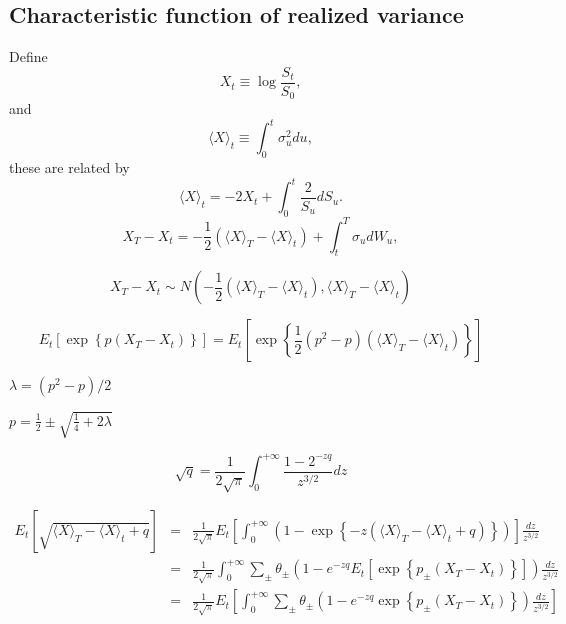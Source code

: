 \documentclass[12pt]{article}
\begin{document}
    \subsection{Characteristic function of realized variance}
    Define
    \begin{equation}
      X_t\equiv\log\frac{S_t}{S_0},
    \end{equation}
    and
    \begin{equation}
      \langle X \rangle_t\equiv\int_0^t\sigma_u^2du,
    \end{equation}
    these are related by
    \begin{equation}
      \langle X \rangle_t=-2X_t+\int_0^t\frac{2}{S_u}dS_u.
    \end{equation}
  \begin{equation}
    X_T-X_t=-\frac{1}{2}\left(\langle X \rangle_T - \langle X \rangle_t\right) + \int_t^T\sigma_udW_u,
  \end{equation}

  \begin{equation}
    X_T-X_t\sim N\left(-\frac{1}{2}\left(\langle X \rangle_T - \langle X \rangle_t\right), \langle X \rangle_T - \langle X \rangle_t\right)
  \end{equation}

  \begin{equation}
    E_t\left[\exp\left\{p\left(X_T-X_t\right)\right\}\right] = E_t\left[\exp\left\{\frac{1}{2}\left(p^2-p\right)\left(\langle X \rangle_T - \langle X \rangle_t\right)\right\}\right]
  \end{equation}

  $\lambda=(p^2-p)/2$

  $p=\frac{1}{2}\pm\sqrt{\frac{1}{4}+2\lambda}$


  \begin{equation}
    \sqrt{q} = \frac{1}{2\sqrt{\pi}}\int_0^{+\infty}\frac{1-2^{-zq}}{z^{3/2}}dz
  \end{equation}

  \begin{eqnarray}
                      E_t\left[\sqrt{\langle X \rangle_T - \langle X \rangle_t+q}\right]
    &=&\frac{1}{2\sqrt{\pi}}E_t\left[\int_0^{+\infty}\left(1-\exp\left\{-z\left(\langle X \rangle_T - \langle X \rangle_t+q\right)\right\}\right)\right]\frac{dz}{z^{3/2}}\nonumber\\
    &=&\frac{1}{2\sqrt{\pi}}\int_0^{+\infty}\sum_{\pm}\theta_{\pm}\left(1-e^{-zq}E_t\left[\exp\left\{p_{\pm}\left(X_T-X_t\right)\right\}\right]\right)\frac{dz}{z^{3/2}}\nonumber\\
    &=&\frac{1}{2\sqrt{\pi}}E_t\left[\int_0^{+\infty}\sum_{\pm}\theta_{\pm}\left(1-e^{-zq}\exp\left\{p_{\pm}\left(X_T-X_t\right)\right\}\right)\frac{dz}{z^{3/2}}\right]
  \end{eqnarray}
\end{document}
